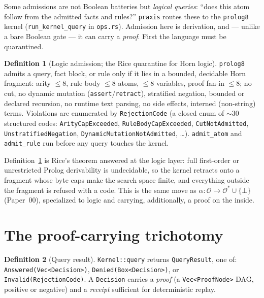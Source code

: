 \documentclass[11pt,oneside]{book}
\theoremstyle{definition}
\newtheorem{definition}{Definition}[chapter]
\theoremstyle{plain}
\theoremstyle{remark}
\newcommand{\Obs}{\mathcal{O}}                 %
\newcommand{\Adm}{\mathcal{O}^{*}}             %
\newcommand{\adm}{\alpha}                      %
\newcommand{\Rfsl}{\bot}                        %
\newcommand{\code}[1]{\texttt{#1}}
\begin{document}
Some admissions are not Boolean batteries but \emph{logical queries}: ``does this atom follow from the admitted facts and rules?'' %
\code{praxis} routes these to the \code{prolog8} kernel (\code{run\_kernel\_query} in \code{ops.rs}). %
Admission here is derivation, and --- unlike a bare Boolean gate --- it can carry a \emph{proof}. %
First the language must be quarantined. %

\begin{definition}[Logic admission; the Rice quarantine for Horn logic]\label{def:logicadm}
\code{prolog8} admits a query, fact block, or rule only if it lies in a bounded, decidable Horn fragment: arity $\le 8$, rule body $\le 8$ atoms, $\le 8$ variables, proof fan-in $\le 8$; no cut, no dynamic mutation (\code{assert}/\code{retract}), stratified negation, bounded or declared recursion, no runtime text parsing, no side effects, interned (non-string) terms. %
Violations are enumerated by \code{RejectionCode} (a closed enum of $\sim\!30$ structured codes: \code{ArityCapExceeded}, \code{RuleBodyCapExceeded}, \code{CutNotAdmitted}, \code{UnstratifiedNegation}, \code{DynamicMutationNotAdmitted}, \dots). %
\code{admit\_atom} and \code{admit\_rule} run before any query touches the kernel. %
\end{definition}

Definition~\ref{def:logicadm} is Rice's theorem \cite{rice1953} answered at the logic layer: full first-order or unrestricted Prolog derivability is undecidable, so the kernel retracts onto a fragment whose byte caps make the search space finite, and everything outside the fragment is refused with a code. %
This is the same move as $\adm:\Obs\to\Adm\cup\{\Rfsl\}$ (Paper~00), specialized to logic and carrying, additionally, a proof on the inside. %

\section{The proof-carrying trichotomy}

\begin{definition}[Query result]\label{def:queryresult}
\code{Kernel::query} returns \code{QueryResult}, one of: \code{Answered(Vec<Decision>)}, \code{Denied(Box<Decision>)}, or \code{Invalid(RejectionCode)}. %
A \code{Decision} carries a \emph{proof} (a \code{Vec<ProofNode>} DAG, positive or negative) and a \emph{receipt} sufficient for deterministic replay. %
\end{definition}
\end{document}
